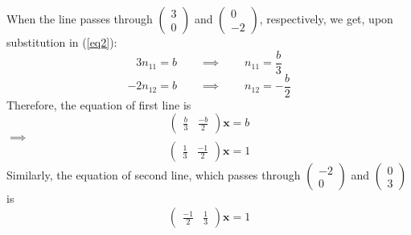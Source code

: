 \documentclass[12pt]{article}
\begin{document}
\noindent
When the line passes through 
$\displaystyle
\begin{pmatrix}
	3 \\ 0
\end{pmatrix}$
and 
$\displaystyle
\begin{pmatrix}
	0 \\ -2
\end{pmatrix}$, respectively,
we get, upon substitution in (\ref{eq2}):
	\[ 3 n_{11} = b \qquad \implies \qquad n_{11} = \frac{b}{3} \]
	\[-2 n_{12} = b \qquad \implies \qquad n_{12} =-\frac{b}{2} \]
Therefore, the equation of first line is
\begin{equation*}
\begin{pmatrix}
	\displaystyle \frac{b}{3} &
	\displaystyle \frac{-b}{2}
\end{pmatrix}
	{\mathbf{x}} = b
\end{equation*}
%
$\implies$
\begin{equation}
\begin{pmatrix}
	\displaystyle \frac{1}{3} &
	\displaystyle \frac{-1}{2}
\end{pmatrix}
	{\mathbf{x}} = 1
\end{equation}
Similarly, the equation of second line, which passes through 
$\displaystyle
\begin{pmatrix}
	-2 \\ 0
\end{pmatrix}$
and 
$\displaystyle
\begin{pmatrix}
	0 \\ 3
\end{pmatrix}$
is 
\begin{equation}
\begin{pmatrix}
	\displaystyle \frac{-1}{2} &
	\displaystyle \frac{1}{3}
\end{pmatrix}
	{\mathbf{x}} = 1
\end{equation}


\end{document}
